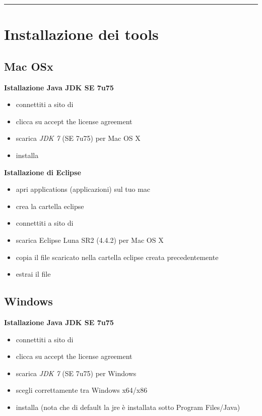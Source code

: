 \documentclass{article}
\begin{document}
\hrule
\section{Installazione dei tools}
\subsection{Mac OSx}
\textbf{Istallazione Java JDK SE 7u75}
\begin{itemize}
\item connettiti a sito di
  \href{http://www.oracle.com/technetwork/java/javase/downloads/jdk7-downloads-1880260.html}{}
\item clicca su accept the license agreement
\item scarica \textit{JDK 7} (SE 7u75) per Mac OS X
\item installa
\end{itemize}

\textbf{Istallazione di Eclipse}
\begin{itemize}
\item apri applications (applicazioni) sul tuo mac
\item crea la cartella eclipse
\item connettiti a sito di \href{https://eclipse.org/downloads/}{}
\item scarica Eclipse Luna SR2 (4.4.2) per Mac OS X
\item copia il file scaricato nella cartella eclipse creata precedentemente
\item estrai il file
\end{itemize}


\subsection{Windows}
\textbf{Istallazione Java JDK SE 7u75}
\begin{itemize}
\item connettiti a sito di
  \href{http://www.oracle.com/technetwork/java/javase/downloads/jdk7-downloads-1880260.html}{}
\item clicca su accept the license agreement
\item scarica \textit{JDK 7} (SE 7u75) per Windows
\item scegli correttamente tra Windows x64/x86
\item installa (nota che di default la jre \`e installata sotto Program Files/Java)
\end{itemize}
\end{document}
